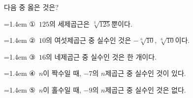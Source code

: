 다음 중 옳은 것은?
\par\medskip\par\noindent\hangindent=1.4em {\small ①}\ $125$의 세제곱근은 $\sqrt[3]{125}$뿐이다.\par\noindent\hangindent=1.4em {\small ②}\ $10$의 여섯제곱근 중 실수인 것은 $-\sqrt[6]{10}$, $\sqrt[6]{10}$이다.\par\noindent\hangindent=1.4em {\small ③}\ $16$의 네제곱근 중 실수인 것은 한 개이다.\par\noindent\hangindent=1.4em {\small ④}\ $n$이 짝수일 때, $-7$의 $n$제곱근 중 실수인 것이 있다.\par\noindent\hangindent=1.4em {\small ⑤}\ $n$이 홀수일 때, $-9$의 $n$제곱근 중 실수인 것은 없다.\par\medskip

